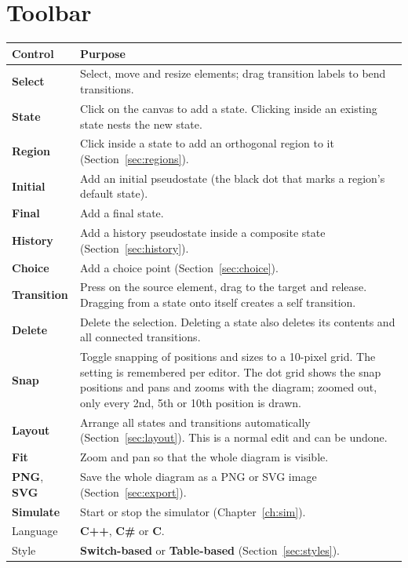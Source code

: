 \documentclass[11pt,a4paper,openany]{report}
\newcommand{\ui}[1]{\textsf{\textbf{#1}}}
\begin{document}
\section{Toolbar}
\begin{longtable}{@{}p{3.1cm}p{11.3cm}@{}}
\toprule
\textbf{Control} & \textbf{Purpose} \\
\midrule
\endhead
\ui{Select}        & Select, move and resize elements; drag transition labels to bend transitions. \\
\ui{State}         & Click on the canvas to add a state. Clicking inside an existing state nests the new state. \\
\ui{Region}        & Click inside a state to add an orthogonal region to it (Section~\ref{sec:regions}). \\
\ui{Initial}       & Add an initial pseudostate (the black dot that marks a region's default state). \\
\ui{Final}         & Add a final state. \\
\ui{History}       & Add a history pseudostate inside a composite state (Section~\ref{sec:history}). \\
\ui{Choice}        & Add a choice point (Section~\ref{sec:choice}). \\
\ui{Transition}    & Press on the source element, drag to the target and release. Dragging from a state onto itself creates a self transition. \\
\ui{Delete}        & Delete the selection. Deleting a state also deletes its contents and all connected transitions. \\
\ui{Snap}          & Toggle snapping of positions and sizes to a 10-pixel grid. The setting is remembered per editor. The dot grid shows the snap positions and pans and zooms with the diagram; zoomed out, only every 2nd, 5th or 10th position is drawn. \\
\ui{Layout}        & Arrange all states and transitions automatically (Section~\ref{sec:layout}). This is a normal edit and can be undone. \\
\ui{Fit}           & Zoom and pan so that the whole diagram is visible. \\
\ui{PNG}, \ui{SVG}  & Save the whole diagram as a PNG or SVG image (Section~\ref{sec:export}). \\
\ui{Simulate}      & Start or stop the simulator (Chapter~\ref{ch:sim}). \\
Language           & \ui{C++}, \ui{C\#} or \ui{C}. \\
Style              & \ui{Switch-based} or \ui{Table-based} (Section~\ref{sec:styles}). \\

\end{longtable}
\end{document}
